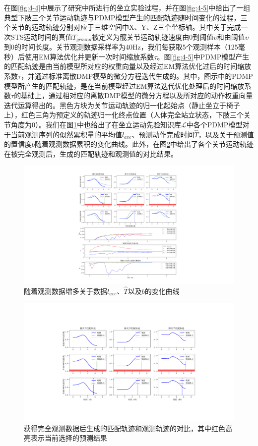 在图\ref{fig:4-4}中展示了研究中所进行的坐立实验过程，并在图\ref{fig:4-5}中给出了一组典型下肢三个关节运动轨迹与PDMP模型产生的匹配轨迹随时间变化的过程，三个关节的运动轨迹分别对应于三维空间中X、Y、Z三个坐标轴。其中关于完成一次STS运动时间的真值$T_{ground}$被定义为髋关节运动轨迹速度由0到阈值$\upsilon $和由阈值$\upsilon$到0的时间长度。关节观测数据采样率为40Hz，我们每获取5个观测样本（125毫秒）后使用EM算法优化并更新一次时间缩放系数$\tau$。图\ref{fig:4-5}中PDMP模型产生的匹配轨迹是由当前模型所对应的权重向量以及经过EM算法优化过后的时间缩放系数$\tau$，并通过标准离散DMP模型的微分方程迭代生成的。其中，图示中的PDMP模型所产生的匹配轨迹，是在当前模型经过EM算法迭代优化处理后的时间缩放系数$\tau$的基础上，通过相对应的离散DMP模型的微分方程以及所对应的动作权重向量迭代运算得出的。黑色方块为关节运动轨迹的归一化起始点（静止坐立于椅子上），红色三角为预定义的轨迹归一化终点位置（人体完全站立状态，下肢三个关节角度为0）。我们在图\ref{fig:4-6}中也给出了在坐立运动先验知识库$\mathscr{L}$中各个PDMP模型对于当前观测序列的似然累积量的平均值$l_{ave}$、预测动作完成时间$\hat T$，以及关于预测值的置信度$b$随着观测数据累积的变化曲线。此外，在图\ref{fig:4-7}中给出了各个关节运动轨迹在被完全观测后，生成的匹配轨迹和观测值的对比结果。
\begin{figure}[htb]
    \centering\includegraphics[width=1\textwidth]{figures/4-Fig-6.pdf}
    \caption{随着观测数据增多关于数据$l_{ave}$、$\hat T$以及$b$的变化曲线}
    \label{fig:4-6}
\end{figure}

\begin{figure}[htb]
    \centering\includegraphics[width=1\textwidth]{figures/4-Fig-7.pdf}
    \caption{获得完全观测数据后生成的匹配轨迹和观测轨迹的对比，其中红色高亮表示当前选择的预测结果}
    \label{fig:4-7}
\end{figure}

